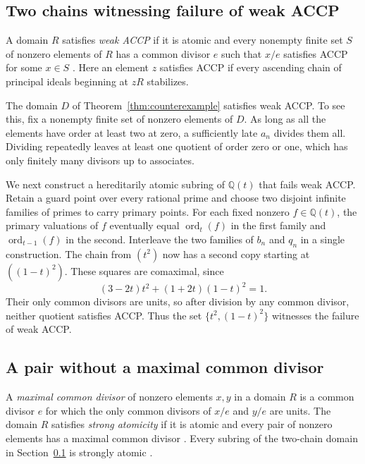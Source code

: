 \documentclass{article}
\DeclareMathOperator{\ord}{ord}
\theoremstyle{remark}
\begin{document}
\subsection{Two chains witnessing failure of weak ACCP}
\label{sec:two-chains}
A domain $R$ satisfies \emph{weak ACCP} if it is atomic and every nonempty finite set $S$ of nonzero elements of $R$ has a common divisor $e$ such that $x/e$ satisfies ACCP for some $x \in S$ \cite[Proposition~3.5(a) and Definition~3.6]{GL}.
Here an element $z$ satisfies ACCP if every ascending chain of principal ideals beginning at $zR$ stabilizes.

The domain $D$ of Theorem~\ref{thm:counterexample} satisfies weak ACCP.
To see this, fix a nonempty finite set of nonzero elements of $D$.
As long as all the elements have order at least two at zero, a sufficiently late $a_n$ divides them all.
Dividing repeatedly leaves at least one quotient of order zero or one, which has only finitely many divisors up to associates.

We next construct a hereditarily atomic subring of $\mathbb{Q}(t)$ that fails weak ACCP.
Retain a guard point over every rational prime and choose two disjoint infinite families of primes to carry primary points.
For each fixed nonzero $f \in \mathbb{Q}(t)$, the primary valuations of $f$ eventually equal $\ord_t(f)$ in the first family and $\ord_{t - 1}(f)$ in the second.
Interleave the two families of $b_n$ and $q_n$ in a single construction.
The chain from $(t^2)$ now has a second copy starting at $((1 - t)^2)$.
These squares are comaximal, since
\[
    (3 - 2t)t^2 + (1 + 2t)(1 - t)^2 = 1.
\]
Their only common divisors are units, so after division by any common divisor, neither quotient satisfies ACCP.
Thus the set $\{t^2, (1 - t)^2\}$ witnesses the failure of weak ACCP.

\subsection{A pair without a maximal common divisor}
\label{sec:no-maximal-common-divisor}
A \emph{maximal common divisor} of nonzero elements $x, y$ in a domain $R$ is a common divisor $e$ for which the only common divisors of $x/e$ and $y/e$ are units.
The domain $R$ satisfies \emph{strong atomicity} if it is atomic and every pair of nonzero elements has a maximal common divisor \cite[p.~5 and Theorem~1.3(c)]{AAZ}.
Every subring of the two-chain domain in Section~\ref{sec:two-chains} is strongly atomic \cite{LeanHA}.
\end{document}
